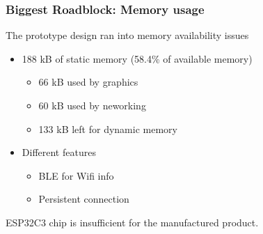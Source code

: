 \documentclass{beamer}
\begin{document}
\begin{frame}
  \frametitle{Biggest Roadblock: Memory usage}

  The prototype design ran into memory availability issues
  \begin{itemize}
    \item 188 kB of static memory (58.4\% of available memory)
    \begin{itemize}
      \item 66 kB used by graphics
      \item 60 kB used by neworking
      \item 133 kB left for dynamic memory
    \end{itemize}
    \item Different features
    \begin{itemize}
      \item BLE for Wifi info
      \item Persistent connection
    \end{itemize}
  \end{itemize}
  ESP32C3 chip is insufficient for the manufactured product.


\end{frame}
\end{document}
